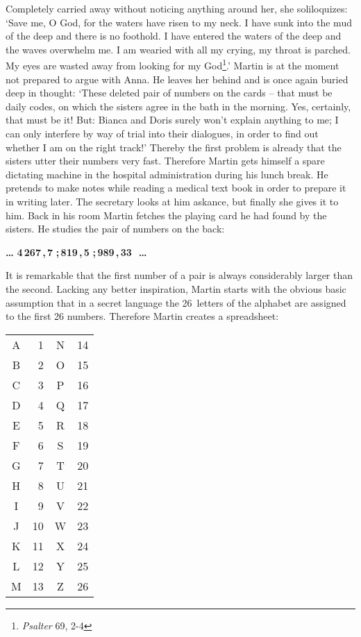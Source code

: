 Completely carried away without noticing anything around her, she soliloquizes: 
`Save me, O God, for the waters have risen to my neck.
I have sunk into the mud of the deep and there is no foothold.
I have entered the waters of the deep and the waves overwhelm me.
I am wearied with all my crying, my throat is parched. My eyes are wasted away from 
looking for my God\footnote{{\em Psalter\/} 69, 2-4}.' 
Martin is at the moment not prepared to argue with Anna.
He leaves her behind and is once again buried deep in thought: `These deleted pair of 
numbers on the cards -- that must be daily codes, on which the sisters agree in the
bath in the morning. 
Yes, certainly, that must be it! 
But: Bianca and Doris surely won't explain anything to me; I can only interfere by 
way of trial into their dialogues, in order to find out whether I am on the right 
track!' 
Thereby the first problem is already that the sisters utter their numbers very 
fast. Therefore Martin gets himself a spare dictating machine in the hospital 
administration during his lunch break. 
He pretends to make notes while reading a medical text book in order to prepare it 
in writing later. 
The secretary looks at him askance, but finally she gives it to him. 
Back in his room Martin fetches the playing card he had found by the sisters. He 
studies the pair of numbers on the back: 
\begin{center}
{\bf \dots \,\,4\,267\,,\,7\,\,;\,819\,,\,5\,\,;\,989\,,\,33
\,\,\dots}
\end{center}
It is remarkable that the first number of a pair is always considerably larger than 
the second. 
Lacking any better inspiration, Martin starts with the obvious basic assumption 
that in a secret language the 26~letters of the alphabet are assigned to the first 
26 numbers. 
Therefore Martin creates a spreadsheet: 
\begin{center}
\begin{tabular}{c|r||c|r}
A & 1 & N & 14 \\
B & 2 & O & 15 \\
C & 3 & P & 16 \\
D & 4 & Q & 17 \\
E & 5 & R & 18 \\
F & 6 & S & 19 \\
G & 7 & T & 20 \\
H & 8 & U & 21 \\
I & 9 & V & 22 \\
J & 10 & W & 23 \\
K & 11 & X & 24 \\
L & 12 & Y & 25 \\
M & 13 & Z & 26
\end{tabular}
\end{center}
